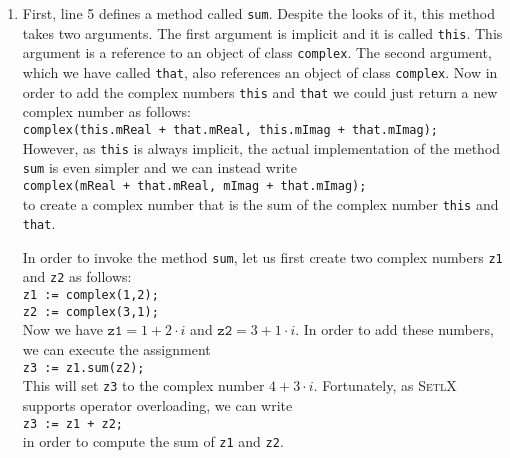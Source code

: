 \begin{enumerate}
\item First, line 5 defines a method called \texttt{sum}.  Despite the looks of it, this
      method takes two arguments.  The first argument is implicit and it is called
      \texttt{this}.  This argument is a reference to an object of class \texttt{complex}.
      The second argument, which we have called \texttt{that}, also references an object
      of class \texttt{complex}.  Now in order to add the complex numbers \texttt{this}
      and \texttt{that} we could just return a new complex number as follows:
      \\[0.2cm]
      \hspace*{1.3cm}
      \texttt{complex(this.mReal + that.mReal, this.mImag + that.mImag);}
      \\[0.2cm]
      However, as \texttt{this} is always implicit, the actual implementation of the
      method \texttt{sum} is even simpler and we can instead write
      \\[0.2cm]
      \hspace*{1.3cm}
      \texttt{complex(mReal + that.mReal, mImag + that.mImag);}
      \\[0.2cm]
      to create a complex number that is the sum of the complex number \texttt{this} and
      \texttt{that}.

      In order to invoke the method \texttt{sum}, let us first create two complex numbers
      \texttt{z1} and \texttt{z2} as follows:      
      \\[0.2cm]
      \hspace*{1.3cm}
      \texttt{z1 := complex(1,2);}
      \\
      \hspace*{1.3cm}
      \texttt{z2 := complex(3,1);}
      \\[0.2cm]
      Now we have $\mathtt{z1} = 1 + 2 \cdot i$ and $\mathtt{z2} = 3 + 1 \cdot i$.  In
      order to add these numbers, we can execute the assignment
      \\[0.2cm]
      \hspace*{1.3cm}
      \texttt{z3 := z1.sum(z2);}
      \\[0.2cm]
      This will set \texttt{z3} to the complex number $4 + 3 \cdot i$.  Fortunately, as
      \textsc{SetlX} supports operator overloading, we can write
      \\[0.2cm]
      \hspace*{1.3cm}
      \texttt{z3 := z1 + z2;}
      \\[0.2cm]
      in order to compute the sum of \texttt{z1} and \texttt{z2}.  


\end{enumerate}
